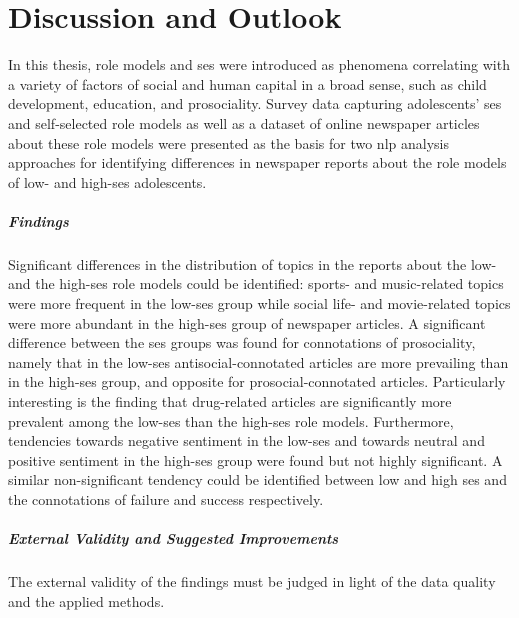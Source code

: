 \renewcommand{\imagepath}{../80-outro/img}

\chapter{Discussion and Outlook}
In this thesis, role models and \gls{ses} were introduced as phenomena correlating with a variety of factors of social and human capital in a broad sense, such as child development, education, and prosociality. Survey data capturing adolescents' \gls{ses} and self-selected role models as well as a dataset of online newspaper articles about these role models were presented as the basis for two \gls{nlp} analysis approaches for identifying differences in newspaper reports about the role models of low- and high-\gls{ses} adolescents.

\paragraph{Findings}
Significant differences in the distribution of topics in the reports about the low- and the high-\gls{ses} role models could be identified: sports- and music-related topics were more frequent in the low-\gls{ses} group while social life- and movie-related topics were more abundant in the high-\gls{ses} group of newspaper articles. A significant difference between the \gls{ses} groups was found for connotations of prosociality, namely that in the low-\gls{ses} antisocial-connotated articles are more prevailing than in the high-\gls{ses} group, and opposite for prosocial-connotated articles. Particularly interesting is the finding that drug-related articles are significantly more prevalent among the low-\gls{ses} than the high-\gls{ses} role models. Furthermore, tendencies towards negative sentiment in the low-\gls{ses} and towards neutral and positive sentiment in the high-\gls{ses} group were found but not highly significant. A similar non-significant tendency could be identified between low and high \gls{ses} and the connotations of failure and success respectively.

\paragraph{External Validity and Suggested Improvements}
The external validity of the findings must be judged in light of the data quality and the applied methods.

